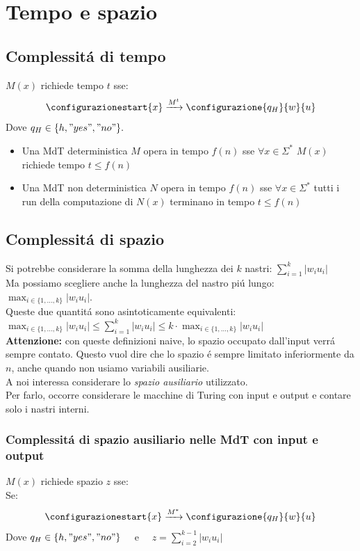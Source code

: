 \section{Tempo e spazio}

\subsection{Complessitá di tempo}
$M(x)$ richiede tempo $t$ sse:
\[
\configurazionestart{x} \xrightarrow{M^t} \configurazione{q_H}{w}{u}
\]
Dove $q_H \in \{h, "yes", "no"\}. $
\begin{itemize}
	\item {Una MdT deterministica $M$ {opera} in tempo $f(n)$ sse $\forall x \in \Sigma^*$ $M(x)$ richiede tempo $t \leq f(n)$} 
	\item {Una MdT non deterministica $N$ {opera} in tempo $f(n)$ sse $\forall x \in \Sigma^*$ tutti i run della computazione di $N(x)$ terminano in tempo $t \leq f(n)$} 
\end{itemize}


\subsection{Complessitá di spazio}
Si potrebbe considerare la somma della lunghezza dei $k$ nastri: $\sum_{i=1}^{k} |w_i u_i|$ \\
Ma possiamo scegliere anche la lunghezza del nastro piú lungo: $\max_{i \in \{1, \dots, k\}} |w_i u_i|$. \\
Queste due quantitá sono asintoticamente equivalenti:\\
$\max_{i \in \{1, \dots, k\}} |w_i u_i| \leq  \sum_{i=1}^{k} |w_i u_i| \leq k \cdot \max_{i \in \{1, \dots, k\}} |w_i u_i|$  \\

\textbf{Attenzione:} con queste definizioni naive, lo spazio occupato dall'input verrá sempre contato.
Questo vuol dire che lo spazio é sempre limitato inferiormente da $n$, anche quando non usiamo variabili ausiliarie. \\
A noi interessa considerare lo \textit{spazio ausiliario} utilizzato. \\
Per farlo, occorre considerare le macchine di Turing con input e output e contare solo i nastri interni.

\subsubsection{Complessitá di spazio ausiliario nelle MdT con input e output}
$M(x)$ richiede spazio $z$ sse: \\
Se:
\[
\configurazionestart{x} \xrightarrow{M^*} \configurazione{q_H}{w}{u}
\]
Dove $q_H \in \{h, "yes", "no"\} \quad$ e {$\quad z = \sum_{i=2}^{k-1} |w_i u_i|$}


